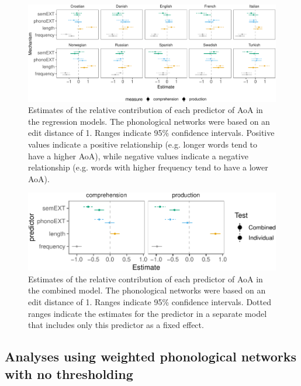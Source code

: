 \documentclass[english,,man,floatsintext]{apa6}
\begin{document}
\begin{figure}[!h]
\includegraphics[width=\textwidth]{ms_files/figure-latex/staticPredEdit1-1} \caption{Estimates of the relative contribution of each predictor of AoA in the regression models. The phonological networks were based on an edit distance of 1. Ranges indicate 95\% confidence intervals. Positive values indicate a positive relationship (e.g. longer words tend to have a higher AoA), while negative values indicate a negative relationship (e.g. words with higher frequency tend to have a lower AoA).}\label{fig:staticPredEdit1}
\end{figure}

\begin{figure}[!h]
\includegraphics[width=\textwidth]{ms_files/figure-latex/staticAllEdit-1} \caption{Estimates of the relative contribution of each predictor of AoA in the combined model. The phonological networks were based on an edit distance of 1. Ranges indicate 95\% confidence intervals. Dotted ranges indicate the estimates for the predictor in a separate model that includes only this predictor as a fixed effect.}\label{fig:staticAllEdit}
\end{figure}

\hypertarget{analyses-using-weighted-phonological-networks-with-no-thresholding}{%
\subsection{Analyses using weighted phonological networks with no thresholding}\label{analyses-using-weighted-phonological-networks-with-no-thresholding}}
\end{document}
